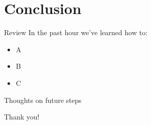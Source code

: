 \section{Conclusion}

\begin{frame}{Review}
In the past hour we've learned how to:
\begin{itemize}
    \item A
    \item B
    \item C
\end{itemize}
\end{frame}

\begin{frame}{Thoughts on future steps}

\end{frame}

\begin{frame}{Thank you!}

\end{frame}